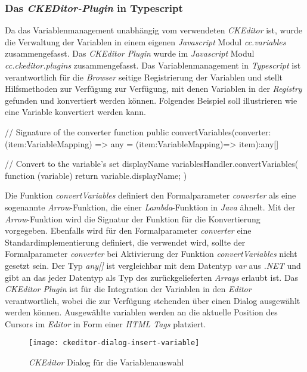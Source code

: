 \subsubsection{Das \emph{CKEDitor-Plugin} in Typescript}
Da das Variablenmanagement unabhängig vom verwendeten \emph{CKEditor} ist, wurde die Verwaltung der Variablen in einem eigenen \emph{Javascript} Modul \emph{cc.variables} zusammengefasst. Das \emph{CKEditor Plugin} wurde im \emph{Javascript} Modul \emph{cc.ckeditor.plugins} zusammengefasst. Das Variablenmanagement in \emph{Typescript} ist verantwortlich für die \emph{Browser} seitige Registrierung der Variablen und stellt Hilfsmethoden zur Verfügung zur Verfügung, mit denen Variablen in der \emph{Registry} gefunden und konvertiert werden können. Folgendes Beispiel soll illustrieren wie eine Variable konvertiert werden kann.
\begin{JsCode}[numbers=none]
// Signature of the converter function
public convertVariables(converter:(item:VariableMapping) => any 
                        = (item:VariableMapping)=> item):any[]

// Convert to the variable's set displayName
variablesHandler.convertVariables(
	function (variable) {
		return variable.displayName;
	}
)                        
\end{JsCode}
Die Funktion \emph{convertVariables} definiert den Formalparameter \emph{converter} als eine sogenannte \emph{Arrow}-Funktion, die einer \emph{Lambda}-Funktion in \emph{Java} ähnelt. Mit der \emph{Arrow}-Funktion wird die Signatur der Funktion für die Konvertierung vorgegeben. Ebenfalls wird für den Formalparameter \emph{converter} eine Standardimplementierung definiert, die verwendet wird, sollte der Formalparameter \emph{converter} bei Aktivierung der Funktion \emph{convertVariables} nicht gesetzt sein. Der Typ \emph{any[]} ist vergleichbar mit dem Datentyp \emph{var} aus \emph{.NET} und gibt an das jeder Datentyp als Typ des zurückgelieferten \emph{Arrays} erlaubt ist.
\newline
\newline
Das \emph{CKEditor Plugin} ist für die Integration der Variablen in den \emph{Editor} verantwortlich, wobei die zur Verfügung stehenden über einen Dialog ausgewählt werden können. Ausgewählte variablen werden an die aktuelle Position des Cursors im \emph{Editor} in Form einer \emph{HTML Tags} platziert.
\begin{figure}[h]
\centering
\texttt{[image: ckeditor-dialog-insert-variable]}
\caption{\emph{CKEditor} Dialog für die Variablenauswahl}
\label{fig:clevermail-rest-tcc}
\end{figure}

